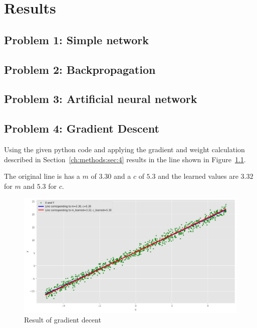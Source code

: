\chapter{Results}
\section{Problem 1: Simple network}
\section{Problem 2: Backpropagation}
\section{Problem 3: Artificial neural network}
\section{Problem 4: Gradient Descent}

Using the given python code and applying the gradient and weight calculation described in Section~\ref{ch:methods:sec:4} results in the line shown in Figure~\ref{problem4_result}.

The original line is has a $m$ of $3.30$ and a $c$ of $5.3$ and the learned values are $3.32$ for $m$ and $5.3$ for $c$.

\begin{figure}[h]
	\centering
    \includegraphics[width=17cm]{img/problem4_result.png}
	\caption{Result of gradient decent}
    \label{problem4_result}
\end{figure}
